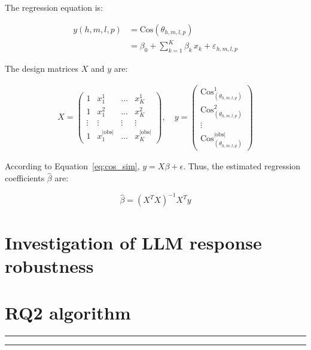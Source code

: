 The regression equation is:

\begin{align}\label{eq:reg}
y(h,m,l,p) &= \text{Cos}(\theta_{h,m,l,p}) \nonumber \\
           &= \beta_{0} + \sum_{k=1}^{K} \beta_{k}\, x_{k} + \varepsilon_{h,m,l,p}
\end{align}

The design matrices \(X\) and \(y\) are:

\begin{gather}\label{eq:reg_matrices}
X = 
\begin{pmatrix}
1 & x^1_1 & \dots & x^1_K \\
1 & x^2_1 & \dots & x^2_K \\
\vdots & \vdots & \vdots & \vdots \\
1 & x^{|\text{obs}|}_1 & \dots & x^{|\text{obs}|}_K
\end{pmatrix}, \quad
y = 
\begin{pmatrix}
\text{Cos}^1_{(\theta_{h,m,l,p})} \\ 
\text{Cos}^2_{(\theta_{h,m,l,p})} \\ 
\vdots \\ 
\text{Cos}^{|\text{obs}|}_{(\theta_{h,m,l,p})}
\end{pmatrix}
\end{gather}

According to Equation~\ref{eq:cos_sim}, \(y = X \beta + \epsilon\). Thus, the estimated regression coefficients
\(\widehat{\beta}\) are:

\begin{equation}\label{eq:reg_solution}
\widehat{\beta} = (X^{T}X)^{-1} X^{T} y
\end{equation}

\section{Investigation of LLM response robustness}

\section{RQ2 algorithm}
\vspace{0.5em}\noindent\hrule
{}
\label{alg:rq2_congruence}
\vspace{-0.5em}\hrule\vspace{0.5em}

